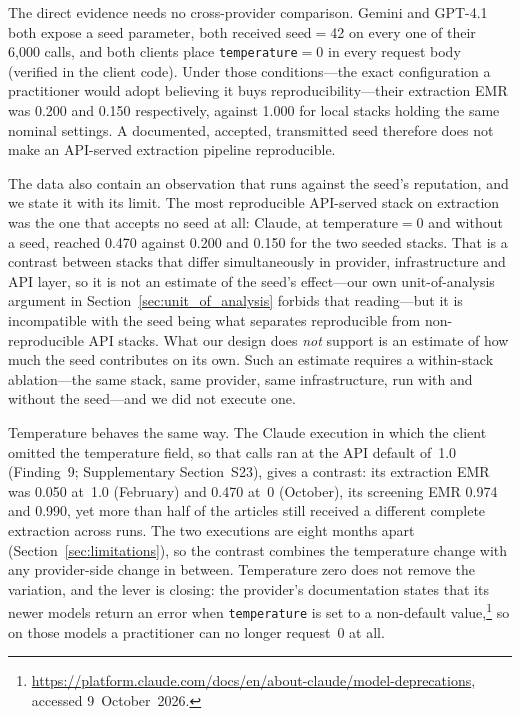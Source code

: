\documentclass[preprint,review,12pt,authoryear]{elsarticle}
\begin{document}
The direct evidence needs no cross-provider comparison. Gemini and GPT-4.1 both expose a seed parameter, both received seed${=}$42 on every one of their 6{,}000 calls, and both clients place \texttt{temperature}${=}$0 in every request body (verified in the client code). Under those conditions---the exact configuration a practitioner would adopt believing it buys reproducibility---their extraction EMR was 0.200 and 0.150 respectively, against 1.000 for local stacks holding the same nominal settings. A documented, accepted, transmitted seed therefore does not make an API-served extraction pipeline reproducible.

The data also contain an observation that runs against the seed's reputation, and we state it with its limit. The most reproducible API-served stack on extraction was the one that accepts no seed at all: Claude, at temperature${=}$0 and without a seed, reached 0.470 against 0.200 and 0.150 for the two seeded stacks. That is a contrast between stacks that differ simultaneously in provider, infrastructure and API layer, so it is not an estimate of the seed's effect---our own unit-of-analysis argument in Section~\ref{sec:unit_of_analysis} forbids that reading---but it is incompatible with the seed being what separates reproducible from non-reproducible API stacks.
What our design does \emph{not} support is an estimate of how much the seed contributes on its own. Such an estimate requires a within-stack ablation---the same stack, same provider, same infrastructure, run with and without the seed---and we did not execute one.

Temperature behaves the same way. The Claude execution in which the client omitted the temperature field, so that calls ran at the API default of~1.0 (Finding~9; Supplementary Section~S23), gives a contrast: its extraction EMR was 0.050 at~1.0 (February) and 0.470 at~0 (October), its screening EMR 0.974 and 0.990, yet more than half of the articles still received a different complete extraction across runs. The two executions are eight months apart (Section~\ref{sec:limitations}), so the contrast combines the temperature change with any provider-side change in between. Temperature zero does not remove the variation, and the lever is closing: the provider's documentation states that its newer models return an error when \texttt{temperature} is set to a non-default value,\footnote{\url{https://platform.claude.com/docs/en/about-claude/model-deprecations}, accessed 9~October~2026.} so on those models a practitioner can no longer request~0 at all.
\end{document}
